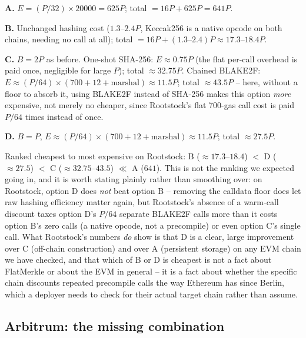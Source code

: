 \textbf{A.} $E=(P/32)\times 20000=625P$; total $=16P+625P=641P$.

\textbf{B.} Unchanged hashing cost ($1.3$--$2.4P$, Keccak256 is a native
opcode on both chains, needing no call at all); total $=16P +
(1.3\text{--}2.4)P \approx 17.3\text{--}18.4P$.

\textbf{C.} $B=2P$ as before. One-shot SHA-256: $E\approx 0.75P$
(the flat per-call overhead is paid once, negligible for large $P$);
total $\approx 32.75P$. Chained BLAKE2F: $E\approx (P/64)\times
(700+12+\text{marshal})\approx 11.5P$; total $\approx 43.5P$ -- here,
without a floor to absorb it, using BLAKE2F instead of SHA-256 makes this
option \emph{more} expensive, not merely no cheaper, since Rootstock's
flat 700-gas call cost is paid $P/64$ times instead of once.

\textbf{D.} $B=P$, $E\approx (P/64)\times(700+12+\text{marshal})\approx
11.5P$; total $\approx 27.5P$.

Ranked cheapest to most expensive on Rootstock: B ($\approx\!17.3$--$18.4$)
$<$ D ($\approx\!27.5$) $<$ C ($\approx\!32.75$--$43.5$) $\ll$ A ($641$).
This is not the ranking we expected going in, and it is worth stating
plainly rather than smoothing over: on Rootstock, option D does
\emph{not} beat option B -- removing the calldata floor does let raw
hashing efficiency matter again, but Rootstock's absence of a warm-call
discount taxes option D's $P/64$ separate BLAKE2F calls more than it
costs option B's zero calls (a native opcode, not a precompile) or even
option C's single call. What Rootstock's numbers \emph{do} show is that
D is a clear, large improvement over C (off-chain construction) and over
A (persistent storage) on any EVM chain we have checked, and that which
of B or D is cheapest is not a fact about FlatMerkle or about the EVM in
general -- it is a fact about whether the specific chain discounts
repeated precompile calls the way Ethereum has since Berlin, which a
deployer needs to check for their actual target chain rather than assume.

\subsection{Arbitrum: the missing combination}
\label{sec:rollup-arb}

